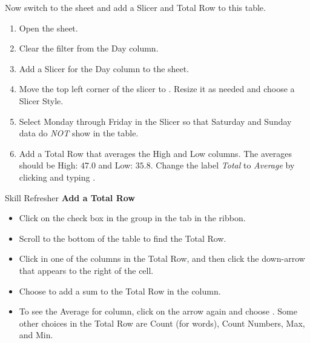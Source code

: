 Now switch to the  sheet and add a Slicer and Total Row to this table.

\begin{enumerate}
	\item Open the  sheet.
	\item Clear the filter from the Day column.
	\item Add a Slicer for the Day column to the sheet.
	\item Move the top left corner of the slicer to . Resize it as needed and choose a Slicer Style.
	\item Select Monday through Friday in the Slicer so that Saturday and Sunday data do \textit{NOT} show in the table.
	\item Add a Total Row that averages the High and Low columns. The averages should be High: $ 47.0 $ and Low: $ 35.8 $. Change the label \textit{Total} to \textit{Average} by clicking  and typing .
\end{enumerate}

\begin{center}
	\begin{sklbox}{Skill Refresher}
		\textbf{Add a Total Row}
		\\
		\begin{itemize}
			\setlength{\itemsep}{0pt}
			\setlength{\parskip}{0pt}
			\setlength{\parsep}{0pt}

			\item Click on the  check box in the  group in the  tab in the ribbon.
			\item Scroll to the bottom of the table to find the Total Row.
			\item Click in one of the columns in the Total Row, and then click the down-arrow that appears to the right of the cell.
			\item Choose  to add a sum to the Total Row in the column.
			\item To see the Average for column, click on the arrow again and choose . Some other choices in the Total Row are Count (for words), Count Numbers, Max, and Min.
			
		\end{itemize}
	\end{sklbox}
\end{center}

